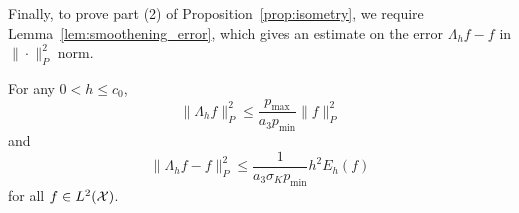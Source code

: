 Finally, to prove part (2) of Proposition~\ref{prop:isometry}, we require Lemma~\ref{lem:smoothening_error}, which gives an estimate on the error $\Lambda_h f - f$ in $\|\cdot\|_P^2$ norm.
\begin{lemma}
	\label{lem:smoothening_error}
	For any $0 < h \leq c_0$, 
	\begin{equation}
	\label{eqn:smoothening_error_norm}
	\bigl\|\Lambda_hf\bigr\|_{P}^2 \leq \frac{p_{\max}}{a_3p_{\min}} \bigl\|f\bigr\|_{P}^2
	\end{equation}
	and
	\begin{equation}
	\label{eqn:smoothening_error_energy}
	\bigl\|\Lambda_hf - f\bigr\|_{P}^2 \leq \frac{1}{a_3\sigma_Kp_{\min}} h^2 E_h(f)
	\end{equation}
	for all $f \in L^2(\mathcal{X})$.
\end{lemma}

